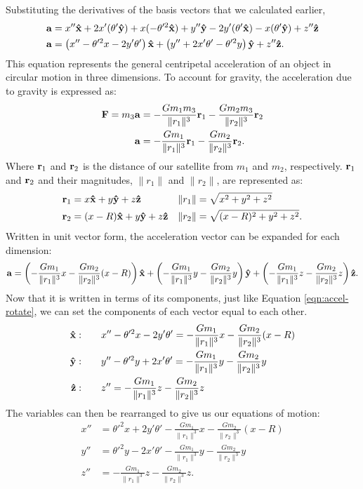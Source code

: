 \begin{samepage}
Substituting the derivatives of the basis vectors that we calculated earlier,
\begin{align}
	\bvec{a} &= x''\uvec{x} + 2x'(\theta'\uvec{y}) + x(- \theta'^2\uvec{x}) + y''\uvec{y} - 2y'(\theta'\uvec{x}) - x(\theta'\uvec{y}) + z''\uvec{z} \nonumber \\
	\bvec{a} &= \left(x'' - \theta'^2x - 2y'\theta'\right)\uvec{x} + \left(y'' + 2x'\theta' - \theta'^2y\right)\uvec{y} + z''\uvec{z} \label{eqn:accel-rotate} \text{.}
\end{align}
This equation represents the general centripetal acceleration of an object in circular motion in three dimensions.
To account for gravity, the acceleration due to gravity is expressed as:
\begin{align*}
	\bm{\mathbf{F}} = m_3\bm{\mathbf{a}} &= - \frac{Gm_1m_3}{\|r_1\|^3}\bm{\mathbf{r}}_1 - \frac{Gm_2m_3}{\|r_2\|^3}\bm{\mathbf{r}}_2 \\
	\bm{\mathbf{a}} &= - \frac{Gm_1}{\|r_1\|^3}\bm{\mathbf{r}}_1 - \frac{Gm_2}{\|r_2\|^3}\bm{\mathbf{r}}_2 \text{.}
\end{align*}
Where $\bm{\mathbf{r}}_1$ and $\bm{\mathbf{r}}_2$ is the distance of our satellite from $m_1$ and $m_2$, respectively.
$\bm{\mathbf{r}}_1$ and $\bm{\mathbf{r}}_2$ and their magnitudes, $\|r_1\|$ and $\|r_2\|$, are represented as:
\begin{align*}
	\bvec{r}_1 &= x\uvec{x} + y\uvec{y} + z\uvec{z} & \|r_1\| &= \sqrt{x^2 + y^2 + z^2} \\
	\bvec{r}_2 &= (x - R)\uvec{x} + y\uvec{y} + z\uvec{z} & \|r_2\| &= \sqrt{(x - R)^2 + y^2 + z^2} \text{.}
\end{align*}
Written in unit vector form, the acceleration vector can be expanded for each dimension:
\begin{equation*}
	\bvec{a} = \left(-\frac{Gm_1}{\|r_1\|^3}x - \frac{Gm_2}{\|r_2\|^3}(x - R)\right)\uvec{x} + \left(-\frac{Gm_1}{\|r_1\|^3}y - \frac{Gm_2}{\|r_2\|^3}y\right)\uvec{y} + \left(-\frac{Gm_1}{\|r_1\|^3}z - \frac{Gm_2}{\|r_2\|^3}z\right)\uvec{z} \text{.}
\end{equation*}
Now that it is written in terms of its components, just like Equation \eqref{eqn:accel-rotate}, we can set the components of each vector equal to each other.
\begin{align*}
	\uvec{x} : \qquad &x'' - \theta'^2x - 2y'\theta' = -\frac{Gm_1}{\|r_1\|^3}x - \frac{Gm_2}{\|r_2\|^3}(x - R) \\
	\uvec{y} : \qquad &y'' - \theta'^2y + 2x'\theta' = -\frac{Gm_1}{\|r_1\|^3}y - \frac{Gm_2}{\|r_2\|^3}y \\
	\uvec{z} : \qquad &z'' = -\frac{Gm_1}{\|r_1\|^3}z - \frac{Gm_2}{\|r_2\|^3}z
\end{align*}
The variables can then be rearranged to give us our equations of motion:
\begin{align}
	x'' &= \theta'^2x + 2y'\theta' -\frac{Gm_1}{\|r_1\|^3}x - \frac{Gm_2}{\|r_2\|^3}(x - R) \label{eqn:eomx}\\
	y'' &= \theta'^2y - 2x'\theta' -\frac{Gm_1}{\|r_1\|^3}y - \frac{Gm_2}{\|r_2\|^3}y \label{eqn:eomy}\\
	z'' &= -\frac{Gm_1}{\|r_1\|^3}z - \frac{Gm_2}{\|r_2\|^3}z \label{eqn:eomz}\text{.}
\end{align}
\end{samepage}

